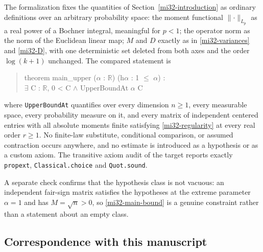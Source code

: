 \documentclass[11pt]{article}
\theoremstyle{definition}
\theoremstyle{remark}
\newcommand{\norm}[1]{\lVert#1\rVert}
\begin{document}
The formalization fixes the quantities of
Section~\ref{mi32-introduction} as ordinary definitions over an
arbitrary probability space: the moment functional
$\norm{\cdot}_{L_p}$ as a real power of a Bochner integral, meaningful
for $p<1$; the operator norm as the norm of the Euclidean linear map;
$M$ and $D$ exactly as in \eqref{mi32-variances} and \eqref{mi32-D},
with one deterministic set deleted from both axes and the order
$\log(k+1)$ unchanged. The compared statement is
\begin{quote}\ttfamily\small
theorem main\_upper ($\alpha$ : $\mathbb R$) (h$\alpha$ : 1 $\le$ $\alpha$) :\\
\phantom{xx}$\exists$ C : $\mathbb R$, 0 < C $\wedge$ UpperBoundAt $\alpha$ C
\end{quote}
where \texttt{UpperBoundAt} quantifies over every dimension $n\ge1$,
every measurable space, every probability measure on it, and every
matrix of independent centered entries with all absolute moments finite
satisfying \eqref{mi32-regularity} at every real order $r\ge1$. No
finite-law substitute, conditional comparison, or assumed contraction
occurs anywhere, and no estimate is introduced as a hypothesis or as a
custom axiom. The transitive axiom audit of the target reports exactly
\texttt{propext}, \texttt{Classical.choice} and \texttt{Quot.sound}.

A separate check confirms that the hypothesis class is not vacuous: an
independent fair-sign matrix satisfies the hypotheses at the extreme
parameter $\alpha=1$ and has $M=\sqrt n>0$, so
\eqref{mi32-main-bound} is a genuine constraint rather than a statement
about an empty class.

\subsection{Correspondence with this manuscript}
\end{document}
